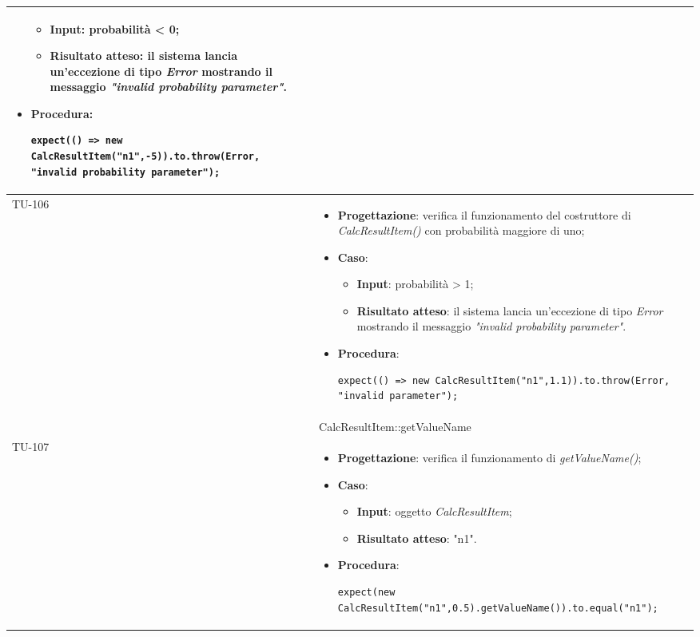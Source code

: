 \begin{longtable}{|C{1.5cm}|C{14.5cm}|}
\begin{itemize}
	\begin{itemize}
		\item \textbf{Input}: probabilità < 0;
		\item \textbf{Risultato atteso}: il sistema lancia un'eccezione di tipo \emph{Error} mostrando il messaggio \emph{"invalid probability parameter"}.
	\end{itemize}
	\item \textbf{Procedura}:
	\begin{lstlisting}
expect(() => new CalcResultItem("n1",-5)).to.throw(Error, "invalid probability parameter");
	\end{lstlisting}
\end{itemize}\\
\hline
{TU-106} &
\begin{itemize}
	\item \textbf{Progettazione}: verifica il funzionamento del costruttore di \emph{CalcResultItem()} con probabilità maggiore di uno;
	\item \textbf{Caso}: 
	\begin{itemize}
		\item \textbf{Input}: probabilità > 1;
		\item \textbf{Risultato atteso}: il sistema lancia un'eccezione di tipo \emph{Error} mostrando il messaggio \emph{"invalid probability parameter"}.
	\end{itemize}
	\item \textbf{Procedura}:
	\begin{lstlisting}
expect(() => new CalcResultItem("n1",1.1)).to.throw(Error, "invalid parameter");
	\end{lstlisting}
\end{itemize}\\
\hline
{} & CalcResultItem::getValueName
\\ \hline
{TU-107} &
\begin{itemize}
	\item \textbf{Progettazione}: verifica il funzionamento di \emph{getValueName()};
	\item \textbf{Caso}: 
	\begin{itemize}
		\item \textbf{Input}: oggetto \emph{CalcResultItem};
		\item \textbf{Risultato atteso}: "n1".
	\end{itemize}
	\item \textbf{Procedura}:
	\begin{lstlisting}
expect(new CalcResultItem("n1",0.5).getValueName()).to.equal("n1");

\end{lstlisting}
\end{itemize}
\end{longtable}
